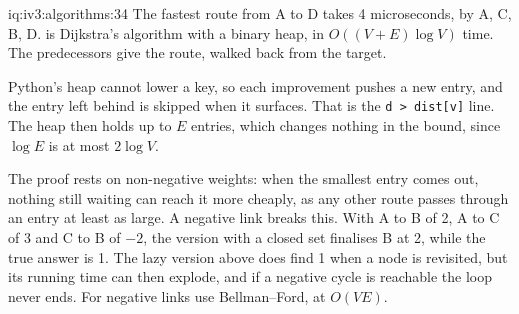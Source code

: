 \begin{solution}{iq:iv3:algorithms:34}
The fastest route from A to D takes 4 microseconds, by A, C, B, D.  is Dijkstra's algorithm with a binary heap, in $O((V + E) \log V)$ time. The predecessors give the route, walked back from the target.
\label{lst:iv3:al:dijkstra}

Python's heap cannot lower a key, so each improvement pushes a new entry, and the entry left behind is skipped when it surfaces. That is the \texttt{d > dist[v]} line. The heap then holds up to $E$ entries, which changes nothing in the bound, since $\log E$ is at most $2 \log V$.

The proof rests on non-negative weights: when the smallest entry comes out, nothing still waiting can reach it more cheaply, as any other route passes through an entry at least as large. A negative link breaks this. With A to B of 2, A to C of 3 and C to B of $-2$, the version with a closed set finalises B at 2, while the true answer is 1. The lazy version above does find 1 when a node is revisited, but its running time can then explode, and if a negative cycle is reachable the loop never ends. For negative links use Bellman--Ford, at $O(VE)$.

\end{solution}

